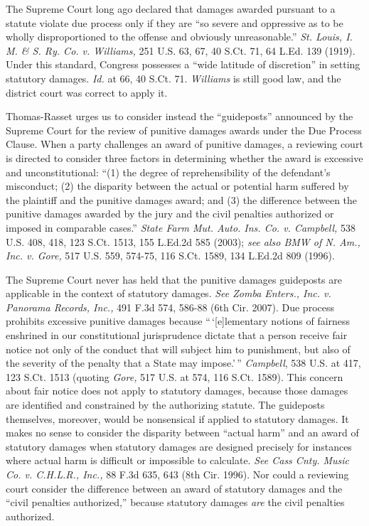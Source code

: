 The Supreme Court long ago declared that damages awarded pursuant to a statute
violate due process only if they are ``so severe and oppressive as to be wholly
disproportioned to the offense and obviously unreasonable.'' \textit{St. Louis,
I. M. \& S. Ry. Co. v. Williams,} 251 U.S. 63, 67, 40 S.Ct. 71, 64 L.Ed. 139
(1919). Under this standard, Congress possesses a ``wide latitude of
discretion'' in setting statutory damages. \textit{Id.} at 66, 40 S.Ct. 71.
\textit{Williams} is still good law, and the district court was correct to
apply it.

Thomas-Rasset urges us to consider instead the ``guideposts'' announced by the
Supreme Court for the review of punitive damages awards under the Due Process
Clause. When a party challenges an award of punitive damages, a reviewing court
is directed to consider three factors in determining whether the award is
excessive and unconstitutional: ``(1) the degree of reprehensibility of the
defendant's misconduct; (2) the disparity between the actual or potential harm
suffered by the plaintiff and the punitive damages award; and (3) the
difference between the punitive damages awarded by the jury and the civil
penalties authorized or imposed in comparable cases.'' \textit{State Farm Mut.
Auto. Ins. Co. v. Campbell,} 538 U.S. 408, 418, 123 S.Ct. 1513, 155 L.Ed.2d 585
(2003); \textit{see also BMW of N. Am., Inc. v. Gore,} 517 U.S. 559, 574-75,
116 S.Ct. 1589, 134 L.Ed.2d 809 (1996).

The Supreme Court never has held that the punitive damages guideposts are
applicable in the context of statutory damages. \textit{See Zomba Enters., Inc.
v. Panorama Records, Inc.,} 491 F.3d 574, 586-88 (6th Cir. 2007). Due process
prohibits excessive punitive damages because ``\,`[e]lementary
notions of fairness enshrined in our constitutional jurisprudence dictate that
a person receive fair notice not only of the conduct that will subject him to
punishment, but also of the severity of the penalty that a State may
impose.'\,'' \textit{Campbell}, 538 U.S. at 417, 123 S.Ct. 1513 (quoting
\textit{Gore,} 517 U.S. at 574, 116 S.Ct. 1589). This concern about fair notice
does not apply to statutory damages, because those damages are identified and
constrained by the authorizing statute. The guideposts themselves, moreover,
would be nonsensical if applied to statutory damages. It makes no sense to
consider the disparity between ``actual harm'' and an award of statutory
damages when statutory damages are designed precisely for instances where
actual harm is difficult or impossible to calculate. \textit{See Cass Cnty.
Music Co. v. C.H.L.R., Inc.,} 88 F.3d 635, 643 (8th Cir. 1996). Nor could a
reviewing court consider the difference between an award of statutory damages
and the ``civil penalties authorized,'' because statutory damages \textit{are}
the civil penalties authorized.

